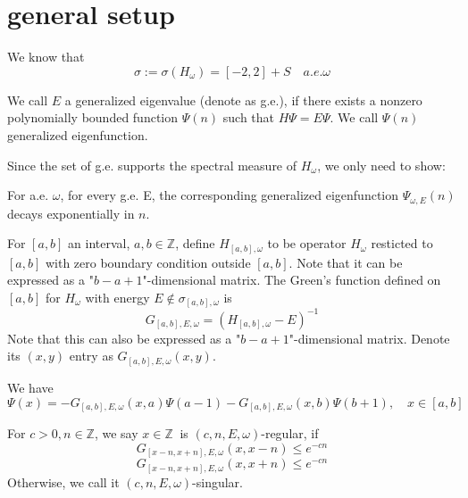\section{general setup}
We know that
\begin{equation}\label{sigma}
\sigma:=\sigma(H_{\omega})=[-2,2]+S\quad a.e.\omega
\end{equation}
\begin{definition}
    We call $E$ a generalized eigenvalue (denote as g.e.), if there exists a nonzero polynomially bounded function $\Psi(n)$ such that $H\Psi=E\Psi$. We call $\Psi(n)$ generalized eigenfunction.
\end{definition}
Since the set of g.e. supports the spectral measure of $H_\omega$, we only need to show:
\begin{thm}\label{thm1}
  For a.e. $\omega$, for every g.e. E, the corresponding generalized eigenfunction $\Psi_{\omega,E}(n)$ decays exponentially in $n$.
\end{thm}

For $[a,b]$ an interval, $a,b\in\mathbb{Z}$, define $H_{[a,b],\omega}$ to be operator $H_\omega$ resticted to $[a,b]$ with zero boundary condition outside $[a,b]$. Note that it can be expressed as a "$b-a+1$"-dimensional matrix.
The Green's function defined on $[a,b]$ for $H_\omega$ with energy $E\notin\sigma_{[a,b],\omega}$ is
  \[
    G_{[a,b],E,\omega}=(H_{[a,b],\omega}-E)^{-1}
  \]
Note that this can also be expressed as a "$b-a+1$"-dimensional matrix. Denote its $(x,y)$ entry as $G_{[a,b],E,\omega}(x,y)$.

We have
  \begin{equation}\label{possion}
    \Psi(x)=-G_{[a,b],E,\omega}(x,a)\Psi(a-1)-G_{[a,b],E,\omega}(x,b)\Psi(b+1),\quad x\in[a,b]
  \end{equation}
%


\begin{definition}
   For $c>0, n\in\mathbb{Z}$, we say $x\in\mathbb{Z}~$ is $(c,n,E,\omega)$-regular, if
  \[
    G_{[x-n,x+n],E,\omega}(x,x-n) \leq e^{-cn}
  \]
  \[
    G_{[x-n,x+n],E,\omega}(x,x+n) \leq e^{-cn}
  \]
  Otherwise, we call it $(c,n,E,\omega)$-singular.
\end{definition}

